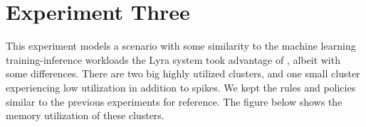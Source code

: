 \section{Experiment Three}

\begin{center}
\end{center}

This experiment models a scenario with some similarity to the machine learning
training-inference workloads the Lyra system took advantage of
\cite{li_lyra_2023}, albeit with some differences. There are two big highly
utilized clusters, and one small cluster experiencing low utilization in
addition to spikes. We kept the rules and policies similar to the previous
experiments for reference. The figure below shows the memory utilization of
these clusters. 


